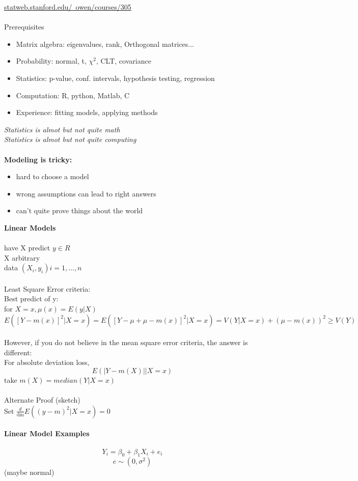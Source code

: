 \documentclass[a4paper,12pt]{article}
\begin{document}
\underline{statweb.stanford.edu/~owen/courses/305}\\
\\
Prerequisites
\begin{itemize}
	\item
Matrix algebra: eigenvalues, rank, Orthogonal matrices...\\
\item
Probability: normal, t, $\chi^2$, CLT, covariance\\
\item
Statistics: p-value, conf. intervals, hypothesis testing, regression\\
\item
Computation: R, python, Matlab, C\\
\item
Experience: fitting models, applying methods\\
\end{itemize}
\emph{Statistics is almot but not quite math}\\
\emph{Statistics is almot but not quite computing}\\
\\
\textbf{Modeling is tricky:}
\begin{itemize}
	\item	hard to choose a model\\
	\item wrong assumptions can lead to right answers\\
	\item can't quite prove things about the world\\
\end{itemize}
\textbf{Linear Models}\\
\\
	have X predict $y \in R$\\
	X arbitrary\\
	data $(X_i, y_i) i = 1, ..., n$\\
	\\
	Least Square Error criteria:\\
	Best predict of y:\\
	for $X = x, 	\mu(x) = E(y|X)$
	\[
		E([Y - m(x)]^2|X = x)
	= E([Y - \mu + \mu - m(x)] ^ 2 | X = x)
	= V(Y | X = x) + (\mu - m(x)) ^ 2
	\geq V(Y)
\]
\\
	However, if you do not believe in the mean square error criteria, the answer is different:\\
	For absolute deviation loss,
	\[
		E(|Y - m(X)| | X = x)
	\]
	take $m(X) = median(Y | X = x)$\\
	\\
	Alternate Proof (sketch)\\
	Set $\frac{d}{\mathrm{dm}} E((y - m) ^ 2 | X = x) = 0$\\
\\
\textbf{Linear Model Examples}\\
\\
\[ Y_i = \beta_0 + \beta_1 X_i + e_i \]
\[ e \sim (0, \sigma ^ 2)\]
(maybe normal) 
\end{document}
